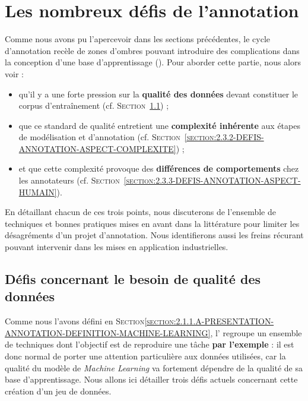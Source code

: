 \section{Les nombreux défis de l'annotation}
\label{section:2.3-DEFIS-ANNOTATION}

	
	Comme nous avons pu l'apercevoir dans les sections précédentes, le cycle d'annotation recèle de zones d'ombres pouvant introduire des complications dans la conception d'une base d'apprentissage (\cite{baledent:2022:complexite-annotation-manuelle}).
	Pour aborder cette partie, nous alors voir :
	\begin{itemize}
		\item qu'il y a une forte pression sur la \textbf{qualité des données} devant constituer le corpus d'entraînement (cf. \textsc{Section~\ref{section:2.3.1-DEFIS-ANNOTATION-ASPECT-DONNEES}}) ;
		\item que ce standard de qualité entretient une \textbf{complexité inhérente} aux étapes de modélisation et d'annotation (cf. \textsc{Section~\ref{section:2.3.2-DEFIS-ANNOTATION-ASPECT-COMPLEXITE}}) ;
		\item et que cette complexité provoque des \textbf{différences de comportements} chez les annotateurs (cf. \textsc{Section~\ref{section:2.3.3-DEFIS-ANNOTATION-ASPECT-HUMAIN}}).
	\end{itemize}
	En détaillant chacun de ces trois points, nous discuterons de l'ensemble de techniques et bonnes pratiques mises en avant dans la littérature pour limiter les désagréments d'un projet d'annotation.
	Nous identifierons aussi les freins récurant pouvant intervenir dans les mises en application industrielles.
	
	
	\subsection{Défis concernant le besoin de qualité des données}
	\label{section:2.3.1-DEFIS-ANNOTATION-ASPECT-DONNEES}
	
		Comme nous l'avons défini en \textsc{Section\ref{section:2.1.1.A-PRESENTATION-ANNOTATION-DEFINITION-MACHINE-LEARNING}}, l' regroupe un ensemble de techniques dont l'objectif est de reproduire une tâche \textbf{par l'exemple} : il est donc normal de porter une attention particulière aux données utilisées, car la qualité du modèle de \textit{Machine Learning} va fortement dépendre de la qualité de sa base d'apprentissage.
		Nous allons ici détailler trois défis actuels concernant cette création d'un jeu de données.
		
